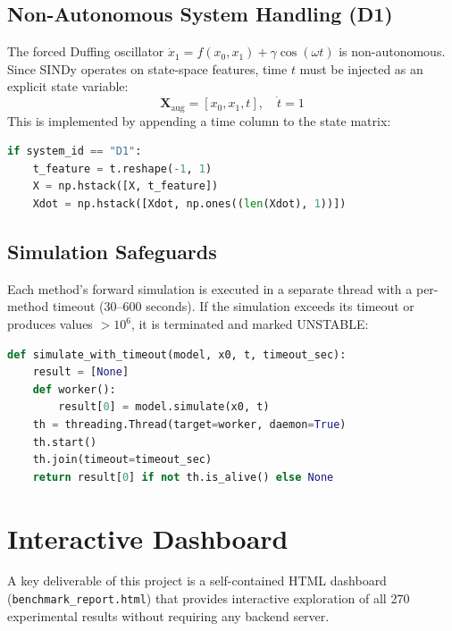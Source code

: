 \documentclass[conference]{IEEEtran}
\begin{document}
\subsection{Non-Autonomous System Handling (D1)}

The forced Duffing oscillator $\dot{x}_1 = f(x_0, x_1) + \gamma\cos(\omega t)$ is non-autonomous. Since SINDy operates on state-space features, time $t$ must be injected as an explicit state variable:
\begin{equation}
\mathbf{X}_\text{aug} = [x_0, x_1, t], \quad \dot{t} = 1
\end{equation}
This is implemented by appending a time column to the state matrix:

\begin{lstlisting}[language=Python, caption={Time augmentation for non-autonomous D1}]
if system_id == "D1":
    t_feature = t.reshape(-1, 1)
    X = np.hstack([X, t_feature])
    Xdot = np.hstack([Xdot, np.ones((len(Xdot), 1))])
\end{lstlisting}

\subsection{Simulation Safeguards}

Each method's forward simulation is executed in a separate thread with a per-method timeout (30--600 seconds). If the simulation exceeds its timeout or produces values $> 10^6$, it is terminated and marked UNSTABLE:

\begin{lstlisting}[language=Python, caption={Thread-based simulation timeout}]
def simulate_with_timeout(model, x0, t, timeout_sec):
    result = [None]
    def worker():
        result[0] = model.simulate(x0, t)
    th = threading.Thread(target=worker, daemon=True)
    th.start()
    th.join(timeout=timeout_sec)
    return result[0] if not th.is_alive() else None
\end{lstlisting}

\section{Interactive Dashboard}
\label{sec:dashboard}

A key deliverable of this project is a self-contained HTML dashboard (\texttt{benchmark\_report.html}) that provides interactive exploration of all 270 experimental results without requiring any backend server.
\end{document}

